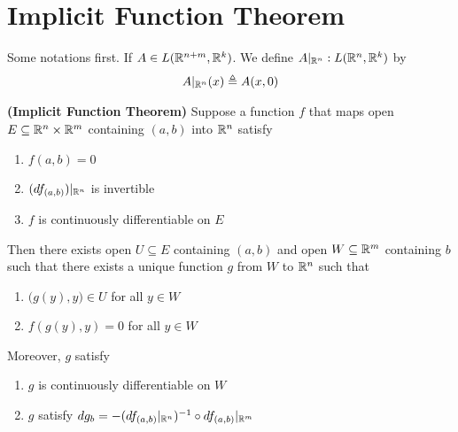 \documentclass{report}
\begin{document}
\section{Implicit Function Theorem}
\begin{mdframed}
Some notations first. If $A \in L(\mathbb{R}^{n+m}, \mathbb{R}^k)$. We define $A|_{\mathbb{R}^n}:L(\mathbb{R}^n,\mathbb{R}^k)$ by
\begin{align*}
A|_{\mathbb{R}^n}(x)\triangleq A(x,0)
\end{align*}
\end{mdframed}
\begin{theorem}
\label{IpFT}
\textbf{(Implicit Function Theorem)} Suppose a function $f$ that maps open $E\subseteq \mathbb{R}^n \times \mathbb{R}^m$ containing $(a,b)$ into $\mathbb{R}^n$ satisfy 
\begin{enumerate}[label=(\alph*)]
  \item $f(a,b)=0$ 
  \item $(df_{(a,b)})|_{\mathbb{R}^n}$ is invertible 
  \item $f$ is continuously differentiable on $E$
\end{enumerate}
Then there exists open $U \subseteq E$ containing $(a,b)$ and open $W\subseteq \mathbb{R}^m$ containing $b$ such that there exists a unique function $g$ from $W$ to  $\mathbb{R}^n$ such that
\begin{enumerate}[label=(\alph*)]
  \item $\big(g(y),y \big) \in U$ for all $y \in W$
  \item $f(g(y),y)=0$ for all $y \in W$  
\end{enumerate}
Moreover, $g$ satisfy 
\begin{enumerate}[label=(\alph*)]
  \item $g$ is continuously differentiable on $W$
   \item $g$ satisfy $dg_b=-(df_{(a,b)}|_{\mathbb{R}^n})^{-1}\circ df_{(a,b)}|_{\mathbb{R}^m}$
\end{enumerate}
\end{theorem}
\end{document}
